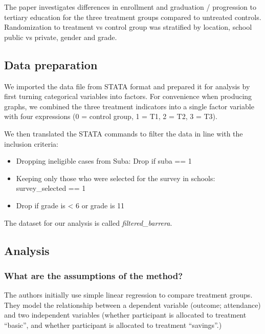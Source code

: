 \documentclass[
]{article}
\providecommand{\tightlist}{%
  \setlength{\itemsep}{0pt}\setlength{\parskip}{0pt}}
\begin{document}
The paper investigates differences in enrollment and graduation /
progression to tertiary education for the three treatment groups
compared to untreated controls. Randomization to treatment vs control
group was stratified by location, school public vs private, gender and
grade.

\hypertarget{data-preparation}{%
\subsection{Data preparation}\label{data-preparation}}

We imported the data file from STATA format and prepared it for analysis
by first turning categorical variables into factors. For convenience
when producing graphs, we combined the three treatment indicators into a
single factor variable with four expressions (0 = control group, 1 = T1,
2 = T2, 3 = T3).

We then translated the STATA commands to filter the data in line with
the inclusion criteria:

\begin{itemize}
\tightlist
\item
  Dropping ineligible cases from Suba: Drop if suba == 1
\item
  Keeping only those who were selected for the survey in schools:
  survey\_selected == 1
\item
  Drop if grade is \textless{} 6 or grade is 11
\end{itemize}

The dataset for our analysis is called \emph{filtered\_barrera}.

\hypertarget{analysis}{%
\subsection{Analysis}\label{analysis}}

\hypertarget{what-are-the-assumptions-of-the-method}{%
\subsubsection{What are the assumptions of the
method?}\label{what-are-the-assumptions-of-the-method}}

The authors initially use simple linear regression to compare treatment
groups. They model the relationship between a dependent variable
(outcome; attendance) and two independent variables (whether participant
is allocated to treatment ``basic'', and whether participant is
allocated to treatment ``savings''.)
\end{document}
